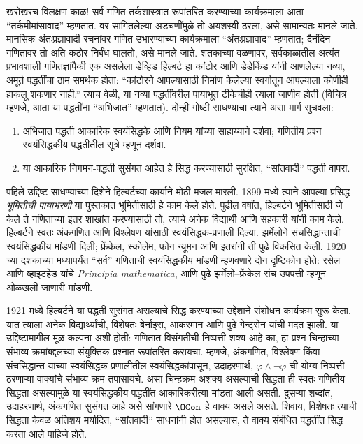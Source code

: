 खरोखरच विलक्षण काळ!{} सर्व गणित तर्कशास्त्रात रूपांतरित करण्याच्या
कार्यक्रमाला आता ``तर्कमीमांसावाद'' म्हणतात. वर सांगितलेल्या अडचणींमुळे
तो अयशस्वी ठरला, असे सामान्यतः मानले जाते. मानसिक अंतःप्रज्ञावादी
रचनांवर गणित उभारण्याच्या कार्यक्रमाला ``अंतःप्रज्ञावाद'' म्हणतात;
दैनंदिन गणितावर तो अति कठोर निर्बंध घालतो, असे मानले जाते. शतकाच्या
वळणावर, सर्वकाळातील अत्यंत प्रभावशाली गणितज्ञांपैकी एक असलेला डेव्हिड
हिल्बर्ट हा कांटोर आणि डेडेकिंड यांनी आणलेल्या नव्या, अमूर्त पद्धतींचा
ठाम समर्थक होता: ``कांटोरने आपल्यासाठी निर्माण केलेल्या स्वर्गातून
आपल्याला कोणीही हाकलू शकणार नाही.'' त्याच वेळी, या नव्या पद्धतींवरील
पायाभूत टीकेचीही त्याला जाणीव होती (विचित्र म्हणजे, आता या पद्धतींना
``अभिजात'' म्हणतात). दोन्ही गोष्टी साधण्याचा त्याने असा मार्ग सुचवला:
\begin{enumerate}
\item अभिजात पद्धती आकारिक स्वयंसिद्धके आणि नियम यांच्या साहाय्याने
  दर्शवा; गणितीय प्रश्न स्वयंसिद्धकीय पद्धतीतील सूत्रे म्हणून दर्शवा.
\item या आकारिक निगमन-पद्धती सुसंगत आहेत हे सिद्ध करण्यासाठी सुरक्षित,
  ``सांतवादी'' पद्धती वापरा.
\end{enumerate}

पहिले उद्दिष्ट साधण्याच्या दिशेने हिल्बर्टच्या कार्याने मोठी मजल मारली.
1899 मध्ये त्याने आपल्या प्रसिद्ध \emph{भूमितीची पायाभरणी} या पुस्तकात
भूमितीसाठी हे काम केले होते. पुढील वर्षांत, हिल्बर्टने भूमितीसाठी जे
केले ते गणिताच्या इतर शाखांत करण्यासाठी तो, त्याचे अनेक विद्यार्थी आणि
सहकारी यांनी काम केले. हिल्बर्टने स्वतः अंकगणित आणि विश्लेषण यांसाठी
स्वयंसिद्धक-प्रणाली दिल्या. झर्मेलोने संचसिद्धान्ताची स्वयंसिद्धकीय मांडणी
दिली; फ्रेंकेल, स्कोलेम, फोन न्यूमन आणि इतरांनी ती पुढे विकसित केली.
1920 च्या दशकाच्या मध्यापर्यंत ``सर्व'' गणिताची स्वयंसिद्धकीय मांडणी
म्हणवणारे दोन दृष्टिकोन होते: रसेल आणि व्हाइटहेड यांचे \emph{Principia
  mathematica}, आणि पुढे झर्मेलो--फ्रेंकेल संच उपपत्ती म्हणून ओळखली
जाणारी मांडणी.

1921 मध्ये हिल्बर्टने या पद्धती सुसंगत असल्याचे सिद्ध करण्याच्या उद्देशाने
संशोधन कार्यक्रम सुरू केला. यात त्याला अनेक विद्यार्थ्यांची, विशेषतः
बेर्नाइस, आकरमान आणि पुढे गेन्ट्सेन यांची मदत झाली. या उद्दिष्टामागील
मूळ कल्पना अशी होती: गणितात विसंगतीची निष्पत्ती शक्य आहे का, हा
प्रश्न चिन्हांच्या संभाव्य क्रमांबद्दलच्या संयुक्तिक प्रश्नात रूपांतरित
करायचा. म्हणजे, अंकगणित, विश्लेषण किंवा संचसिद्धान्त यांच्या
स्वयंसिद्धक-प्रणालीतील स्वयंसिद्धकांपासून, उदाहरणार्थ, $\varphi \land
\lnot \varphi$ ची योग्य निष्पत्ती ठरणाऱ्या वाक्यांचे संभाव्य क्रम
तपासायचे. असा चिन्हक्रम अशक्य असल्याची सिद्धता ही स्वतः गणितीय सिद्धता
असल्यामुळे या स्वयंसिद्धकीय पद्धतींत आकारिकरीत्या मांडता आली असती.
दुसऱ्या शब्दांत, उदाहरणार्थ, अंकगणित सुसंगत आहे असे सांगणारे
$\OCon$ हे वाक्य असले असते. शिवाय, विशेषतः त्याची सिद्धता केवळ अतिशय
मर्यादित, ``सांतवादी'' साधनांनी होत असल्यास, ते वाक्य संबंधित पद्धतींत
सिद्ध करता आले पाहिजे होते.

